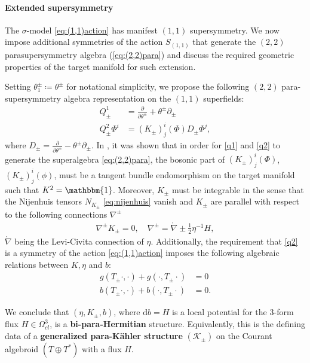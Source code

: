 \documentclass{article}
\newcommand{\TT}{{T\oplus T^*}}
\newcommand{\KK}{\mathcal{K}}
\newcommand{\id}{\mathbbm{1}}
\newcommand{\lc}{\mathring{\n}}
\newcommand{\p}{\partial}
\newcommand{\n}{\nabla}
\newcommand{\rd}{\mathrm{d}}
\theoremstyle{definition}
\theoremstyle{remark}
\begin{document}
\paragraph{Extended supersymmetry}

The $\sigma$-model \eqref{eq:(1,1)action} has manifest $(1,1)$ supersymmetry.  We now impose additional symmetries of the action $S_{(1,1)}$ that generate the $(2,2)$ parasupersymmetry algebra (\ref{eq:(2,2)para}) and discuss the required geometric properties of the target manifold for such extension.

Setting $\theta^\pm_1\coloneqq \theta^\pm$ for notational simplicity, we propose the following $(2,2)$ para-supersymmetry algebra representation on the $(1,1)$ superfields:
\begin{align}
\label{q1} Q^1_\pm&=\frac{\p}{\p\theta^\pm}+\theta^\pm\p_\pm \\
\label{q2} Q^2_\pm\Phi^i&=(K_\pm)^i_j(\Phi)D_\pm\Phi^j,
\end{align}
where $D_\pm =\frac{\p}{\p\theta^\pm}-\theta^\pm\p_\pm$. In \cite{HullTwistedSUSY}, it was shown that in order for \eqref{q1} and \eqref{q2} to generate the superalgebra \eqref{eq:(2,2)para}, the bosonic part of $(K_\pm)^i_j(\Phi)$, $(K_\pm)^i_j(\phi)$, must be a tangent bundle endomorphism on the target manifold such that $K^2=\id$. Moreover, $K_\pm$ must be integrable in the sense that the Nijenhuis tensors $N_{K_\pm}$ \eqref{eq:nijenhuis} vanish and $K_\pm$ are parallel with respect to the following connections $\n^\pm$
\begin{align*}
\n^\pm K_\pm=0, \quad \n^\pm=\lc\pm\frac{1}{2}\eta^{-1}H,
\end{align*}
$\lc$ being the Levi-Civita connection of $\eta$. Additionally, the requirement that \eqref{q2} is a symmetry of the action \eqref{eq:(1,1)action} imposes the following algebraic relations between $K,\eta$ and $b$:
\begin{align*}
g(T_\pm\cdot,\cdot)+g(\cdot,T_\pm\cdot)&=0\\
b(T_\pm\cdot,\cdot)+b(\cdot,T_\pm\cdot)&=0.
\end{align*}

We conclude that $(\eta,K_\pm,b)$, where $\rd b=H$ is a local potential for the $3$-form flux $H\in\Omega_{cl}^3$, is a {\bf bi-para-Hermitian} structure. Equivalently, this is the defining data of a {\bf generalized para-K\"ahler structure} $(\KK_\pm)$ on the Courant algebroid $(\TT)$ with a flux $H$.
\end{document}
